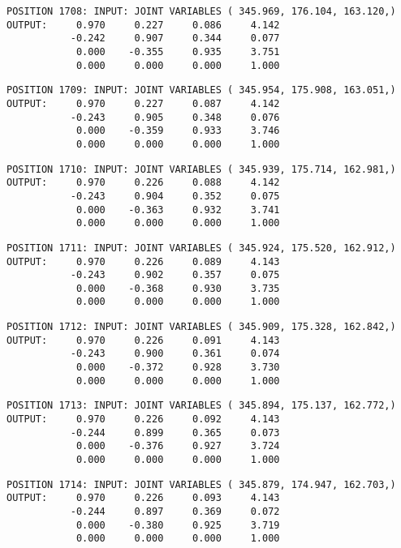 \begin{verbatim}
POSITION 1708: INPUT: JOINT VARIABLES ( 345.969, 176.104, 163.120,)
OUTPUT:     0.970     0.227     0.086     4.142
           -0.242     0.907     0.344     0.077
            0.000    -0.355     0.935     3.751
            0.000     0.000     0.000     1.000
\end{verbatim} \pagebreak[1]\begin{verbatim}
POSITION 1709: INPUT: JOINT VARIABLES ( 345.954, 175.908, 163.051,)
OUTPUT:     0.970     0.227     0.087     4.142
           -0.243     0.905     0.348     0.076
            0.000    -0.359     0.933     3.746
            0.000     0.000     0.000     1.000
\end{verbatim} \pagebreak[1]\begin{verbatim}
POSITION 1710: INPUT: JOINT VARIABLES ( 345.939, 175.714, 162.981,)
OUTPUT:     0.970     0.226     0.088     4.142
           -0.243     0.904     0.352     0.075
            0.000    -0.363     0.932     3.741
            0.000     0.000     0.000     1.000
\end{verbatim} \pagebreak[1]\begin{verbatim}
POSITION 1711: INPUT: JOINT VARIABLES ( 345.924, 175.520, 162.912,)
OUTPUT:     0.970     0.226     0.089     4.143
           -0.243     0.902     0.357     0.075
            0.000    -0.368     0.930     3.735
            0.000     0.000     0.000     1.000
\end{verbatim} \pagebreak[1]\begin{verbatim}
POSITION 1712: INPUT: JOINT VARIABLES ( 345.909, 175.328, 162.842,)
OUTPUT:     0.970     0.226     0.091     4.143
           -0.243     0.900     0.361     0.074
            0.000    -0.372     0.928     3.730
            0.000     0.000     0.000     1.000
\end{verbatim} \pagebreak[1]\begin{verbatim}
POSITION 1713: INPUT: JOINT VARIABLES ( 345.894, 175.137, 162.772,)
OUTPUT:     0.970     0.226     0.092     4.143
           -0.244     0.899     0.365     0.073
            0.000    -0.376     0.927     3.724
            0.000     0.000     0.000     1.000
\end{verbatim} \pagebreak[1]\begin{verbatim}
POSITION 1714: INPUT: JOINT VARIABLES ( 345.879, 174.947, 162.703,)
OUTPUT:     0.970     0.226     0.093     4.143
           -0.244     0.897     0.369     0.072
            0.000    -0.380     0.925     3.719
            0.000     0.000     0.000     1.000
\end{verbatim} \pagebreak[1]\begin{verbatim}

\end{verbatim}
